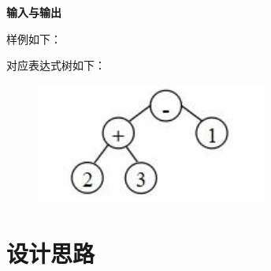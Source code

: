 \documentclass[UTF8]{article}
\begin{document}
	\textbf{输入与输出}\par
	样例如下：\par
	\par
	对应表达式树如下：\par
	\begin{figure}[H]
		\centering
		\includegraphics[width=0.6\linewidth]{sampleExpressionTree.jpg}
		\label{sampleExpressionTree}
	\end{figure}\par
	

	\section{设计思路}
\end{document}
